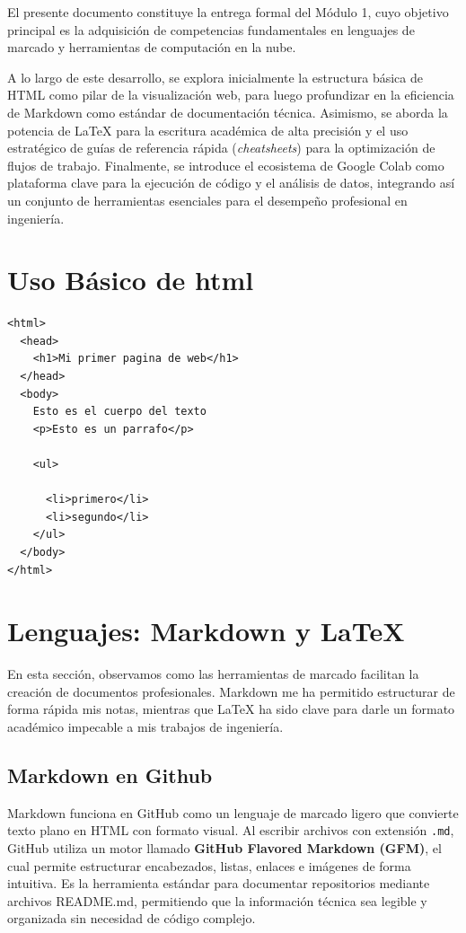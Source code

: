\documentclass[runningheads]{llncs}
\begin{document}
El presente documento constituye la entrega formal del Módulo 1, cuyo objetivo principal es la adquisición de competencias fundamentales en lenguajes de marcado y herramientas de computación en la nube. 

A lo largo de este desarrollo, se explora inicialmente la estructura básica de HTML como pilar de la visualización web, para luego profundizar en la eficiencia de Markdown como estándar de documentación técnica. Asimismo, se aborda la potencia de LaTeX para la escritura académica de alta precisión y el uso estratégico de guías de referencia rápida (\textit{cheatsheets}) para la optimización de flujos de trabajo. Finalmente, se introduce el ecosistema de Google Colab como plataforma clave para la ejecución de código y el análisis de datos, integrando así un conjunto de herramientas esenciales para el desempeño profesional en ingeniería.

\section{Uso Básico de html}

\begin{lstlisting}[caption={Estructura básica de un documento HTML5.}, label={list:html_ejemplo}]
<html>
  <head>
    <h1>Mi primer pagina de web</h1>
  </head>
  <body>
    Esto es el cuerpo del texto
    <p>Esto es un parrafo</p>
    
    <ul>
      
      <li>primero</li>
      <li>segundo</li>
    </ul>
  </body>
</html>
\end{lstlisting}

\section{Lenguajes: Markdown y LaTeX}

En esta sección, observamos como las herramientas de marcado facilitan la creación de documentos profesionales. Markdown me ha permitido estructurar de forma rápida mis notas, mientras que LaTeX ha sido clave para darle un formato académico impecable a mis trabajos de ingeniería.

\subsection{Markdown en Github}

Markdown funciona en GitHub como un lenguaje de marcado ligero que convierte texto plano en HTML con formato visual. Al escribir archivos con extensión \texttt{.md}, GitHub utiliza un motor llamado \textbf{GitHub Flavored Markdown (GFM)}, el cual permite estructurar encabezados, listas, enlaces e imágenes de forma intuitiva. Es la herramienta estándar para documentar repositorios mediante archivos README.md, permitiendo que la información técnica sea legible y organizada sin necesidad de código complejo.
\end{document}
